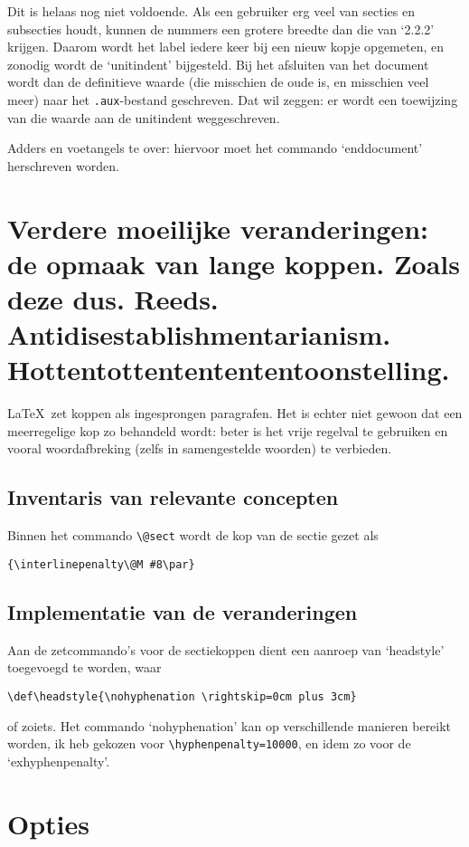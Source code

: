 \documentclass[oldtoc,a4paper,10pt]{rapport3}
\begin{document}
Dit is helaas nog niet voldoende.  Als een gebruiker erg veel van
secties en subsecties houdt, kunnen de nummers een grotere breedte dan
die van `2.2.2' krijgen.  Daarom wordt het label iedere keer bij een
nieuw kopje opgemeten, en zonodig wordt de `unitindent' bijgesteld.
Bij het afsluiten van het document wordt dan de definitieve waarde
(die misschien de oude is, en misschien veel meer) naar het
\texttt{.aux}-bestand geschreven.  Dat wil zeggen: er wordt een
toewijzing van die waarde aan de unitindent weggeschreven.
 
Adders en voetangels te over: hiervoor moet het commando
`enddocument' herschreven worden.
 
 
 
\section{Verdere moeilijke veranderingen: de opmaak van
  lange koppen. Zoals deze dus.  Reeds. Antidisestablishmentarianism.
  Hottentottententententoonstelling.}
 
\LaTeX\ zet koppen als ingesprongen paragrafen. Het is echter niet
gewoon dat een meerregelige kop zo behandeld wordt: beter is het vrije
regelval te gebruiken en vooral woordafbreking (zelfs in samengestelde
woorden) te verbieden.
 
\subsection{Inventaris van relevante concepten}
Binnen het commando \verb.\@sect. wordt de kop van de sectie gezet als
\begin{verbatim}
{\interlinepenalty\@M #8\par}
\end{verbatim}
 
\subsection{Implementatie van de veranderingen}
Aan de zetcommando's voor de sectiekoppen dient een aanroep van
`headstyle' toegevoegd te worden, waar
\begin{verbatim}
\def\headstyle{\nohyphenation \rightskip=0cm plus 3cm}
\end{verbatim}
of zoiets.  Het commando `nohyphenation' kan op verschillende manieren
bereikt worden, ik heb gekozen voor \verb+\hyphenpenalty=10000+, en
idem zo voor de `exhyphenpenalty'.
 
 
\section{Opties}
 
\end{document}
